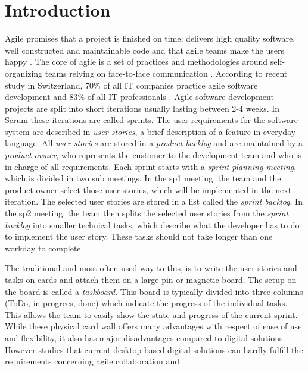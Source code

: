 \documentclass{sigchi}
\begin{document}

\section{Introduction}
Agile promises that a project is finished on time, delivers high quality software, well constructed and maintainable code and that agile teams make the users happy \cite{Stellman:2014}.
The core of agile is a set of practices and methodologies around self-organizing teams relying on face-to-face communication \cite{Cockburn:2001}.
According to recent study in Switzerland, 70\% of all IT companies practice agile software development and 83\% of all IT professionals \cite{Kropp:2015}.
Agile software development projects are split into short iterations usually lasting between 2-4 weeks. In Scrum these iterations are called sprints.
The user requirements for the software system are described in \textit{user stories}, a brief description of a feature in everyday language.
All \textit{user stories} are stored in a \textit{product backlog} and are maintained by a \textit{product owner}, who represents the customer to the development team and who is in charge of all requirements.
Each sprint starts with a \textit{sprint planning meeting}, which is divided in two sub meetings. In the \gls{sp1} meeting, the team and the product owner select those user stories, which will be implemented in the next iteration.
The selected user stories are stored in a list called the \textit{sprint backlog}.
In the \gls{sp2} meeting, the team then splits the selected user stories from the \textit{sprint backlog} into smaller technical tasks, which describe what the developer has to do to implement the user story. These tasks should not take longer than one workday to complete.

The traditional and most often used way to this, is to write the user stories and tasks on cards and attach them on a large pin or magnetic board.
The setup on the board is called a \textit{taskboard}. This board is typically divided into three columns (ToDo, in progrees, done) which indicate the progress of the individual tasks. This allows the team to easily show the state and progress of the current sprint. While these physical card wall offers many advantages with respect of ease of use and flexibility, it also has major disadvantages compared to digital solutions. However studies that current desktop based digital solutions can hardly fulfill the requirements concerning agile collaboration \cite{udcw:31721} and \cite{Mateescu:2015} .
\end{document}
